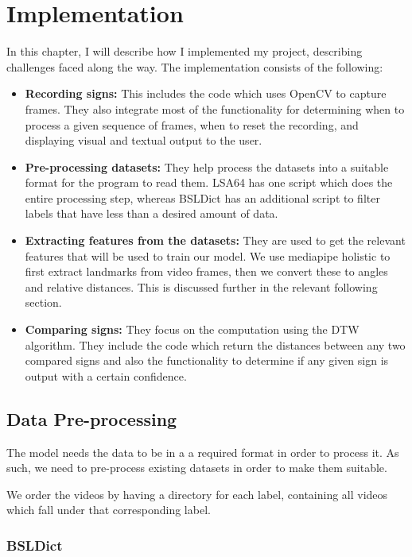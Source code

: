 \documentclass[final,dissertation.tex]{subfiles}
\begin{document}
\chapter{Implementation}

In this chapter, I will describe how I implemented my project, describing challenges faced along the way. The implementation consists of the following:

\begin{itemize}
    \item \textbf{Recording signs: }This includes the code which uses OpenCV to capture frames. They also integrate most of the functionality for determining when to process a given sequence of frames, when to reset the recording, and displaying visual and textual output to the user.
    \item \textbf{Pre-processing datasets: }They help process the datasets into a suitable format for the program to read them. LSA64 has one script which does the entire processing step, whereas BSLDict has an additional script to filter labels that have less than a desired amount of data.
    \item \textbf{Extracting features from the datasets: }They are used to get the relevant features that will be used to train our model. We use mediapipe holistic to first extract landmarks from video frames, then we convert these to angles and relative distances. This is discussed further in the relevant following section.
    \item \textbf{Comparing signs: }They focus on the computation using the DTW algorithm. They include the code which return the distances between any two compared signs and also the functionality to determine if any given sign is output with a certain confidence.
\end{itemize}

\section{Data Pre-processing}

The model needs the data to be in a a required format in order to process it. As such, we need to pre-process existing datasets in order to make them suitable.

We order the videos by having a directory for each label, containing all videos which fall under that corresponding label.

\subsection*{BSLDict}
\end{document}
